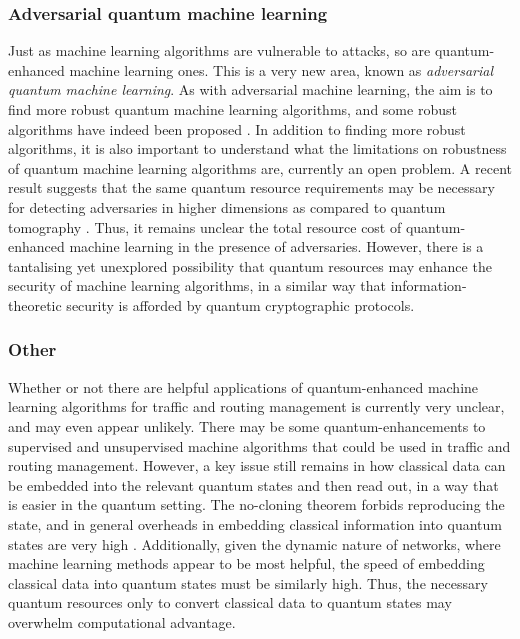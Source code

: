 \documentclass[twocolumn, aps, rmp, amsmath, amssymb, nofootinbib, superscriptaddress, longbibliography, floatfix, table-of-contents, eqsecnum]{revtex4}
\begin{document}
\subsubsection{Adversarial quantum machine learning}

Just as machine learning algorithms are vulnerable to attacks, so are quantum-enhanced machine learning ones. This is a very new area, known as \textit{adversarial quantum machine learning}. As with adversarial machine learning, the aim is to find more robust quantum machine learning algorithms, and some robust algorithms have indeed been proposed \cite{bib:wiebe2018hardening}. In addition to finding more robust algorithms, it is also important to understand what the limitations on robustness of quantum machine learning algorithms are, currently an open problem. A recent result suggests that the same quantum resource requirements may be necessary for detecting adversaries in higher dimensions as compared to quantum tomography \cite{bib:advql}. Thus, it remains unclear the total resource cost of quantum-enhanced machine learning in the presence of adversaries. However, there is a tantalising yet unexplored possibility that quantum resources may enhance the security of machine learning algorithms, in a similar way that information-theoretic security is afforded by quantum cryptographic protocols.

\subsubsection{Other}

Whether or not there are helpful applications of quantum-enhanced machine learning algorithms for traffic and routing management is currently very unclear, and may even appear unlikely. There may be some quantum-enhancements to supervised and unsupervised machine algorithms that could be used in traffic and routing management. However, a key issue still remains in how classical data can be embedded into the relevant quantum states and then read out, in a way that is easier in the quantum setting. The no-cloning theorem forbids reproducing the state, and in general overheads in embedding classical information into quantum states are very high \cite{bib:giovannetti2008quantum, bib:giovannetti2008architectures}. Additionally, given the dynamic nature of networks, where machine learning methods appear to be most helpful, the speed of embedding classical data into quantum states must be similarly high. Thus, the necessary quantum resources only to convert classical data to quantum states may overwhelm computational advantage. 
\end{document}
